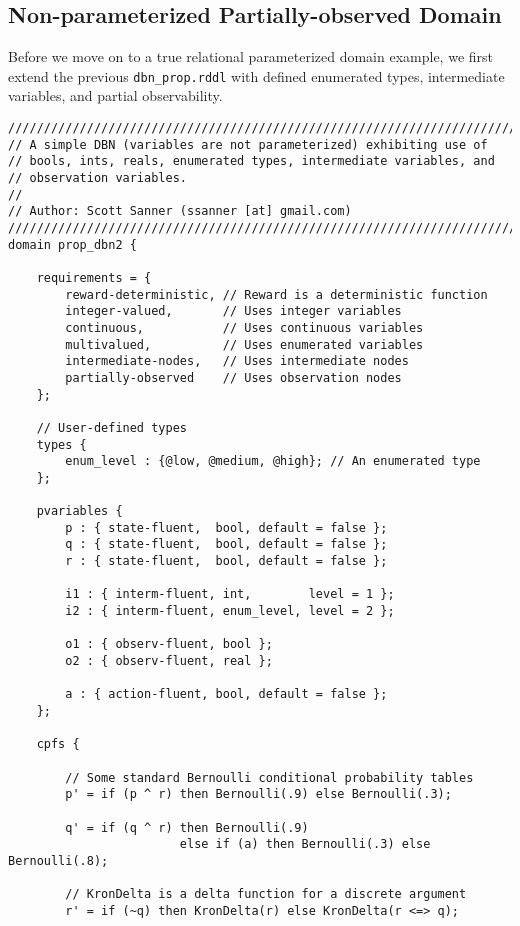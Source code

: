 \documentclass[11pt,a4paper]{article}
\begin{document}
\subsection{Non-parameterized Partially-observed Domain}

Before we move on to a true relational parameterized domain example, we
first extend the previous \texttt{dbn\_prop.rddl} with defined
enumerated types, intermediate variables, and partial observability.

\newpage
\begin{lstlisting}[title=dbn\_types\_interm\_po.rddl]
////////////////////////////////////////////////////////////////////////
// A simple DBN (variables are not parameterized) exhibiting use of
// bools, ints, reals, enumerated types, intermediate variables, and
// observation variables.
//
// Author: Scott Sanner (ssanner [at] gmail.com)
////////////////////////////////////////////////////////////////////////
domain prop_dbn2 {
  	
	requirements = { 
		reward-deterministic, // Reward is a deterministic function
		integer-valued,       // Uses integer variables
		continuous,           // Uses continuous variables
		multivalued,          // Uses enumerated variables
		intermediate-nodes,   // Uses intermediate nodes
		partially-observed    // Uses observation nodes 
	};
      	
	// User-defined types
	types {
		enum_level : {@low, @medium, @high}; // An enumerated type
	};

	pvariables { 
		p : { state-fluent,  bool, default = false };
		q : { state-fluent,  bool, default = false };
		r : { state-fluent,  bool, default = false };
		 
		i1 : { interm-fluent, int,        level = 1 };
		i2 : { interm-fluent, enum_level, level = 2 };
		
		o1 : { observ-fluent, bool };
		o2 : { observ-fluent, real };
		
		a : { action-fluent, bool, default = false }; 
	};
  
	cpfs {

		// Some standard Bernoulli conditional probability tables
		p' = if (p ^ r) then Bernoulli(.9) else Bernoulli(.3);
						
		q' = if (q ^ r) then Bernoulli(.9) 
						else if (a) then Bernoulli(.3) else Bernoulli(.8);

		// KronDelta is a delta function for a discrete argument
		r' = if (~q) then KronDelta(r) else KronDelta(r <=> q);
		

\end{lstlisting}
\end{document}

